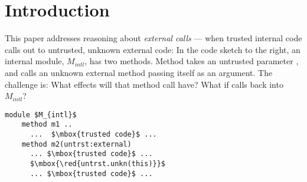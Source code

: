 



\section{Introduction}
\label{s:intro}

\begin{minipage}{.65\textwidth}
This paper addresses reasoning about \emph{external calls} --- when
trusted internal code calls out to untrusted, unknown external code:
In the code sketch to the right, 
an internal module, $M_{intl}$, has two methods. %
Method  takes an untrusted parameter ,
and calls an unknown external method  passing itself as an argument. 
The challenge is: %
What effects will that method call have?
What if  calls back into $M_{intl}$? %
\end{minipage}
\hfill
\begin{minipage}{.35\textwidth}
\begin{lstlisting}[mathescape=true, language=Chainmail,frame=none,numbers=none]
  module $M_{intl}$        
    method m1 ..
      ...  $\mbox{trusted code}$ ...  
    method m2(untrst:external) 
      ... $\mbox{trusted code}$ ...
      $\mbox{\red{untrst.unkn(this)}}$   
      ... $\mbox{trusted code}$ ...
\end{lstlisting}
\end{minipage}


